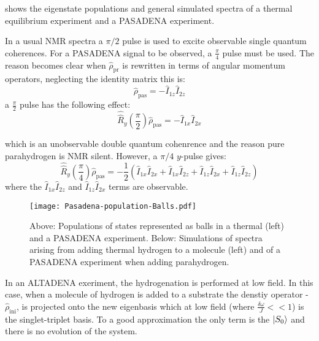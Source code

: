   shows the eigenstate populations and general simulated spectra of a thermal equilibrium experiment and
 a PASADENA experiment.

 In a usual NMR spectra a $\pi/2$ pulse is used to excite observable single quantum coherences. For a PASADENA signal to
 be observed, a $\frac{\pi}{4}$ pulse must be used. The reason becomes clear when $\hat{\rho}_{\text{pr}}$ is rewritten
 in terms of angular momentum operators, neglecting the identity matrix this is:
 \begin{equation}
   \hat{\rho}_{\text{pas}} = -\hat{I}_{1z}\hat{I}_{2z}
 \end{equation}
 a $\frac{\pi}{2}$ pulse has the following effect:
 \begin{equation}
   \hat{\hat{R}}_y(\frac{\pi}{2})\hat{\rho}_{\text{pas}} = -\hat{I}_{1x}\hat{I}_{2x}
 \end{equation}

 which is an unobservable double quantum cohenrence and the reason pure parahydrogen is NMR silent. However,
 a $\pi/4$ $y$-pulse gives:
 \begin{equation}
 \hat{\hat{R}}_y(\frac{\pi}{4})\hat{\rho}_{\text{pas}} = -\frac{1}{2}(\hat{I}_{1x}\hat{I}_{2x} + \hat{I}_{1x}\hat{I}_{2z} + \hat{I}_{1z}\hat{I}_{2x} + \hat{I}_{1z}\hat{I}_{2z})
 \end{equation}
where the $\hat{I}_{1x}\hat{I}_{2z}$ and $\hat{I}_{1z}\hat{I}_{2x}$ terms are observable.
 \begin{figure*}
   \begin{center}
   \texttt{[image: Pasadena-population-Balls.pdf]}
   \end{center}
   \caption{Above: Populations of states represented as balls in a thermal (left) and a PASADENA experiment. Below: Simulations of spectra arising from adding thermal hydrogen to a molecule (left) and of a PASADENA experiment when adding parahydrogen.}
   \label{fig:PASADENA}
 \end{figure*}

 In an ALTADENA exeriment, the hydrogenation is performed at low field. In this case, when a molecule of hydrogen
 is added to a substrate the denstiy operator - $\hat{\rho}_\text{ini}$, is projected onto the new eigenbasis which
 at low field (where $\frac{\delta{\omega}}{J}<<1$) is the singlet-triplet basis. To a good approximation the only term is the $\ket{S_0}$ and there is no evolution of the system.

